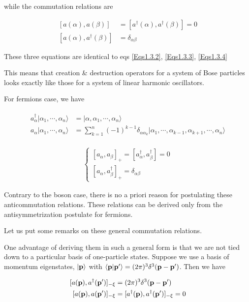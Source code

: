 ﻿\documentclass[twoside]{book}
\numberwithin{equation}{section}
\begin{document}
while the commutation relations are 

\begin{equation}
\begin{split}
[a(\alpha),a(\beta)] &= [a^\dagger(\alpha),a^\dagger(\beta)] = 0\\
[a(\alpha),a^\dagger(\beta)] &= \delta_{\alpha\beta}
\end{split}
\end{equation}

These three equations are identical to eqs \eqref{Eqs1.3.2}, \eqref{Eqs1.3.3}, \eqref{Eqs1.3.4}

This means that creation \& destruction operators for a system of Bose particles looks exactly like those for a system of linear harmonic oscillators. 

For fermions case, we have

\begin{align}
\begin{split}
a_\alpha^\dagger|\alpha_1,\cdots,\alpha_n\rangle &= |\alpha,\alpha_1,\cdots,\alpha_n\rangle\\
a_\alpha|\alpha_1,\cdots,\alpha_n\rangle &= \sum_{k=1}^n(-1)^{k-1}\delta_{\alpha\alpha_k}|\alpha_1,\cdots,\alpha_{k-1},\alpha_{k+1},\cdots,\alpha_n\rangle
\end{split}
\end{align}

\begin{align}
\begin{cases}
[a_\alpha,a_\beta]_+ = [a_\alpha^\dagger,a_\beta^\dagger] = 0\\
[a_\alpha,a_\beta^\dagger]_+ = \delta_{\alpha\beta}
\end{cases}
\end{align}

Contrary to the boson case, there is no a priori reason for  postulating these anticommutation relations. These relations can be derived only from the antisymmetrization postulate for fermions. 

Let us put some remarks on these general commutation relations. 

One advantage of deriving them in such a general form is that we are not tied down to a particular basis of one-particle states. Suppose we use a basis of momentum eigenstates, $|\bf p\rangle$ with $\langle{\bf p}|{\bf p'}\rangle = (2\pi)^3\delta^3({\bf p}-{\bf p'})$. Then we have

\begin{align}
\begin{split}
[a({\bf p}),a^\dagger({\bf p'})]_{-\xi}&=(2\pi)^3\delta^3({\bf p}-{\bf p'})\\
[a({\bf p}), a({\bf p'})]_{-\xi} &= [a^\dagger({\bf p}),a^\dagger({\bf p'})]_{-\xi} = 0
\end{split}
\end{align}
\end{document}
